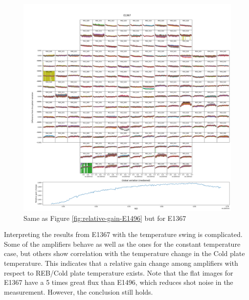 \begin{figure}[ht]
    \centering
    \includegraphics[width=1\linewidth]{figures/gaintemp/E1367gainoverall_global.png}
    \caption{Same as Figure \ref{fig:relative-gain-E1496} but for E1367}
    \label{fig:relative-gain-E1367}
\end{figure}
Interpreting the results from E1367 with the temperature swing is complicated. Some of the amplifiers behave as well as the ones for the constant temperature case, but others show correlation with the temperature change in the Cold plate temperature. This indicates that a relative gain change among amplifiers with respect to REB/Cold plate temperature exists.
Note that the flat images for E1367 have a 5 times great flux than E1496, which reduces shot noise in the measurement. However, the conclusion still holds.

